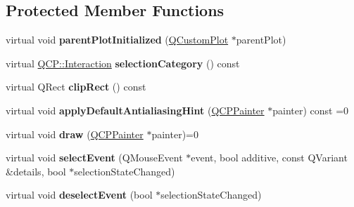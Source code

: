 \subsection*{Protected Member Functions}
\begin{DoxyCompactItemize}
\item 
virtual void {\bfseries parent\+Plot\+Initialized} (\hyperlink{classQCustomPlot}{Q\+Custom\+Plot} $\ast$parent\+Plot)\hypertarget{classQCPLayerable_ab20b7dbd8e0249ed61adb9622c427382}{}\label{classQCPLayerable_ab20b7dbd8e0249ed61adb9622c427382}

\item 
virtual \hyperlink{namespaceQCP_a2ad6bb6281c7c2d593d4277b44c2b037}{Q\+C\+P\+::\+Interaction} {\bfseries selection\+Category} () const \hypertarget{classQCPLayerable_aa4035e586b7f317a06ba7e74e242a5ea}{}\label{classQCPLayerable_aa4035e586b7f317a06ba7e74e242a5ea}

\item 
virtual Q\+Rect {\bfseries clip\+Rect} () const \hypertarget{classQCPLayerable_a07a8f746640c3704b09910df297afcba}{}\label{classQCPLayerable_a07a8f746640c3704b09910df297afcba}

\item 
virtual void {\bfseries apply\+Default\+Antialiasing\+Hint} (\hyperlink{classQCPPainter}{Q\+C\+P\+Painter} $\ast$painter) const =0\hypertarget{classQCPLayerable_afdf83ddc6a265cbf4c89fe99d3d93473}{}\label{classQCPLayerable_afdf83ddc6a265cbf4c89fe99d3d93473}

\item 
virtual void {\bfseries draw} (\hyperlink{classQCPPainter}{Q\+C\+P\+Painter} $\ast$painter)=0\hypertarget{classQCPLayerable_aecf2f7087482d4b6a78cb2770e5ed12d}{}\label{classQCPLayerable_aecf2f7087482d4b6a78cb2770e5ed12d}

\item 
virtual void {\bfseries select\+Event} (Q\+Mouse\+Event $\ast$event, bool additive, const Q\+Variant \&details, bool $\ast$selection\+State\+Changed)\hypertarget{classQCPLayerable_a7498c2d0d081cf7cad0fb3bb93aa0e91}{}\label{classQCPLayerable_a7498c2d0d081cf7cad0fb3bb93aa0e91}

\item 
virtual void {\bfseries deselect\+Event} (bool $\ast$selection\+State\+Changed)\hypertarget{classQCPLayerable_ae546370644a5551c76af739afc008bee}{}\label{classQCPLayerable_ae546370644a5551c76af739afc008bee}


\end{DoxyCompactItemize}
